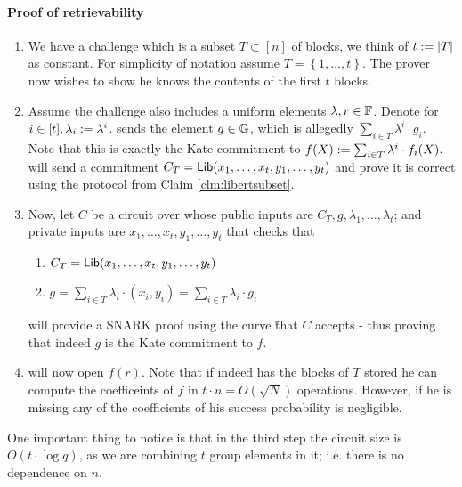 \documentclass[11pt]{article}
\numberwithin{figure}{section} %
\newcommand{\set}[1]{\ensuremath{\left\{#1\right\}}\xspace}
\begin{document}
\paragraph{Proof of retrievability}
\begin{enumerate}
 \item We have a challenge which is a subset $T\subset [n]$ of blocks, we think of $t:= |T|$ as constant. For simplicity of notation assume $T=\set{1,\ldots,t}$. The prover \prv now wishes to show he knows the contents of the first $t$ blocks.
 \item\label{stp:comb} Assume the challenge also includes a uniform elements $\lambda,r\in{\mathbb F}$.
 Denote for $i\in [t], \lambda_i:= \lambda^i$.
 \prv sends the element $g\in {\mathbb G}$, which is allegedly $\sum_{i\in T} \lambda^i\cdot g_i$.
 Note that this is exactly the Kate commitment to $f(X):= \sum_{i\in T} \lambda^i\cdot f_i(X)$.
 \prv will send a commitment $C_T=\mathsf{Lib}(x_1,\ldots,x_t,y_1,\ldots,y_t)$ and prove it is correct using the protocol from Claim \ref{clm:libertsubset}.
 \item Now, let $C$ be a circuit over \Fr whose public inputs are $C_T,g,\lambda_1,\ldots,\lambda_t$; and private inputs are $x_1,\ldots,x_t,$$y_1,\ldots,y_t$ that checks that
 \begin{enumerate}
  \item $C_T=\mathsf{Lib}(x_1,\ldots,x_t,y_1,\ldots,y_t)$
  
  \item $g=\sum_{i\in T} \lambda_i \cdot (x_i,y_i) = \sum_{i\in T} \lambda_i \cdot g_i$ 
 \end{enumerate}
\prv will provide a SNARK proof using the curve \H that $C$ accepts - thus proving that indeed $g$ is the Kate commitment to $f$.
\item \prv  will now open $f(r)$. Note that if \prv indeed has the blocks of $T$ stored he can compute the coefficeints of $f$ in  $t\cdot n = O(\sqrt{N})$ operations. However, if he is missing any of the coefficients of  his success probability is negligible.
\end{enumerate}
 
One important thing to notice is that in the third step the circuit size is $O(t\cdot \log q)$,
as we are combining $t$ group elements in it; i.e. there is no dependence on $n$.
 
 
\end{document}
